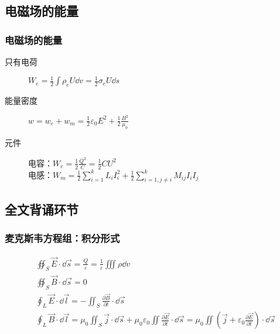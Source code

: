 \documentclass{beamer}
\begin{document}
\subsection{电磁场的能量}

\begin{frame}[c]
    \frametitle{电磁场的能量}

    \begin{description}
        \item[只有电荷] $W_e=\frac{1}{2}\int\rho_eU\dd v=\frac{1}{2}\sigma_eU\dd s$
        \item[能量密度] $w=w_e+w_m=\frac{1}{2}\varepsilon_0 E^2+\frac{1}{2}\frac{B^2}{\mu_0}$
        \item[元件] 电容：$W_e=\frac{1}{2}\frac{Q^2}{C}=\frac{1}{2}CU^2$\\电感：$W_m=\frac{1}{2}\sum^k_{i=1}L_iI_i^2+\frac{1}{2}\sum^k_{i=1, j\neq i}M_{ij}I_iI_j$
    \end{description}
\end{frame}

\subsection{全文背诵环节}

\begin{frame}[c]
    \frametitle{麦克斯韦方程组：积分形式}

    $$\begin{aligned}
             & \oiint_S\vec{E}\cdot\dd\vec{s}=\frac{Q}{\varepsilon}=\frac{1}{\varepsilon}\iiint\rho\dd v                                                                                                                                    \\
             & \oiint_S\vec{B}\cdot\dd\vec{s}=0                                                                                                                                                                                             \\
             & \oint_L\vec{E}\cdot\dd\vec{l}=-\iint_S\frac{\partial\vec{B}}{\partial t}\cdot\dd\vec{s}                                                                                                                                      \\
             & \oint_L\vec{B}\cdot\dd\vec{l}=\mu_0\iint_S\vec{j}\cdot\dd\vec{s}+\mu_0\varepsilon_0\iint\frac{\partial\vec{E}}{\partial t}\cdot\dd\vec{s}=\mu_0\iint(\vec{j}+\varepsilon_0\frac{\partial\vec{E}}{\partial t})\cdot\dd\vec{s}
        \end{aligned}$$
\end{frame}
\end{document}
